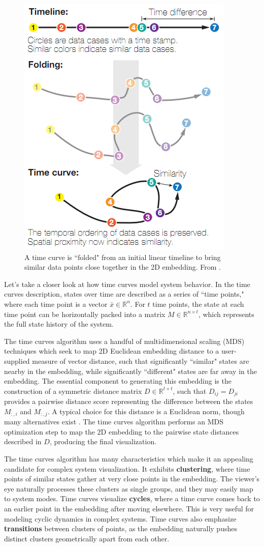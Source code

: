 \begin{figure}[h]
\centering
    \includegraphics[width=0.5\columnwidth]{images/time_curve_example.png}
    \caption{A time curve is ``folded" from an initial linear timeline to bring similar data points close together in the 2D embedding. From \cite{bach2016time}.}
    \label{fig:time_curve_example}
\end{figure}

Let's take a closer look at how time curves model system behavior. In the time curves description, states over time are described as a series of ``time points," where each time point is a vector $\bar{x} \in \mathbb{R}^{n}$. For $t$ time points, the state at each time point can be horizontally packed into a matrix $M \in \mathbb{R}^{n \times t}$, which represents the full state history of the system.

The time curves algorithm uses a handful of multidimensional scaling (MDS) techniques which seek to map 2D Euclidean embedding distance to a user-supplied measure of vector distance, such that significantly ``similar" states are nearby in the embedding, while significantly ``different" states are far away in the embedding. The essential component to generating this embedding is the construction of a symmetric distance matrix $D \in \mathbb{R}^{t \times t}$, such that $D_{ij} = D_{ji}$ provides a pairwise distance score representing the difference between the states $M_{:,i}$ and $M_{:,j}$. A typical choice for this distance is a Euclidean norm, though many alternatives exist \cite{bach2016time}. The time curves algorithm performs an MDS optimization step to map the 2D embedding to the pairwise state distances described in $D$, producing the final visualization.

The time curves algorithm has many characteristics which make it an appealing candidate for complex system visualization. It exhibits \textbf{clustering}, where time points of similar states gather at very close points in the embedding. The viewer's eye naturally processes these clusters as single groups, and they may easily map to system modes. Time curves visualize \textbf{cycles}, where a time curve comes back to an earlier point in the embedding after moving elsewhere. This is very useful for modeling cyclic dynamics in complex systems. Time curves also emphasize \textbf{transitions} between clusters of points, as the embedding naturally pushes distinct clusters geometrically apart from each other.

